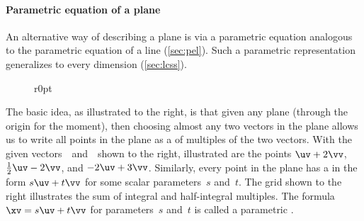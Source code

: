 



\paragraph{Parametric equation of a plane}
An alternative way of describing a plane is via a parametric equation analogous to the parametric equation of a line (\cref{sec:pel}).
Such a parametric representation generalizes to every dimension (\cref{sec:lcss}).

\begin{figure}r{0pt}
\end{figure}
The basic idea, as illustrated to the right, is that given any plane (through the origin for the moment), then choosing almost any two vectors in the plane allows us to write all points in the plane as a  of multiples of the two vectors.
With the given vectors~\uv\ and~\vv\ shown to the right, illustrated are the points \(\uv+2\vv\), \(\tfrac12\uv-2\vv\), and \(-2\uv+3\vv\).
Similarly, every point in the plane has a  in the form \(s\uv+t\vv\) for some scalar parameters~\(s\) and~\(t\).
The grid shown to the right illustrates the sum of integral and half-integral multiples.
The formula \(\xv=s\uv+t\vv\) for parameters~\(s\) and~\(t\) is called a parametric .




